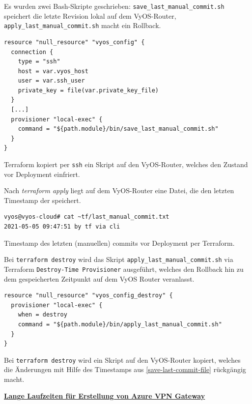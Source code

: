Es wurden zwei Bash-Skripte geschrieben: \texttt{save\_last\_manual\_commit.sh} speichert die letzte Revision lokal auf dem VyOS-Router, \texttt{apply\_last\_manual\_commit.sh} macht ein Rollback.
\begin{listing}[h]
\begin{verbatim}
resource "null_resource" "vyos_config" {
  connection {
    type = "ssh"
    host = var.vyos_host
    user = var.ssh_user
    private_key = file(var.private_key_file)
  }
  [...]
  provisioner "local-exec" {
    command = "${path.module}/bin/save_last_manual_commit.sh"
  }
}

\end{verbatim}
\caption{Terraform kopiert per \texttt{ssh} ein Skript auf den VyOS-Router, welches den Zustand vor Deployment \glqq einfriert\grqq{}.}
\label{save-last-commit-vyos}
\end{listing}\FloatBarrier
Nach \textit{terraform apply} liegt auf dem VyOS-Router eine Datei, die den letzten Timestamp der speichert.
\begin{listing}[h]
\begin{verbatim}
vyos@vyos-cloud# cat ~tf/last_manual_commit.txt
2021-05-05 09:47:51 by tf via cli
\end{verbatim}
\caption{Timestamp des letzten (manuellen) commits vor Deployment per Terraform.}
\label{save-last-commit-file}
\end{listing}\FloatBarrier
Bei \texttt{terraform destroy} wird das Skript \texttt{apply\_last\_manual\_commit.sh} via Terraform \texttt{Destroy-Time Provisioner} ausgeführt, welches den Rollback hin zu dem gespeicherten Zeitpunkt auf dem VyOS Router veranlasst.
\begin{listing}[h]
\begin{verbatim}
resource "null_resource" "vyos_config_destroy" {
  provisioner "local-exec" {
    when = destroy
    command = "${path.module}/bin/apply_last_manual_commit.sh"
  }
}

\end{verbatim}
\caption{Bei \texttt{terraform destroy} wird ein Skript auf den VyOS-Router kopiert, welches die Änderungen mit Hilfe des Timestamps aus \ref{save-last-commit-file} rückgängig macht.}
\label{apply-last-commit-vyos}
\end{listing}\FloatBarrier
\textbf{\underline{Lange Laufzeiten für Erstellung von Azure VPN Gateway}}\label{azure-deployment-time}\\
